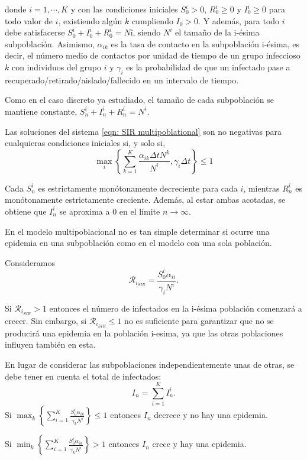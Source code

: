donde $i=1, \cdots , K$ y con las condiciones iniciales $S_0^i > 0$, $R_0^i \geq 0$ y $I_0^i\geq 0$ para todo valor de $i$, existiendo algún $k$ cumpliendo $I_0>0$. Y además, para todo $i$ debe satisfacerse $S_0^i+I_0^i+R_0^i=Nî$, siendo $N^i$ el tamaño de la i-ésima subpoblación. Asimismo, $\alpha_{ik}$ es la tasa de contacto en la subpoblación i-ésima, es decir, el número medio de contactos por unidad de tiempo de un grupo infeccioso $k$ con individuos del grupo $i$ y $\gamma_i$ es la probabilidad de que un infectado pase a recuperado/retirado/aislado/fallecido en un intervalo de tiempo.

Como en el caso discreto ya estudiado, el tamaño de cada subpoblación se mantiene constante, $S_n^i+I_n^i+R_n^i=N^i$.

\begin{proposition}
Las soluciones del sistema \eqref{eqn: SIR multipoblational} son no negativas para cualquieras condiciones iniciales si, y solo si,
$$\max_i \left\{ \sum_{k=1}^{K} \frac{\alpha_{ik}\Delta t N^k}{N^i}, \gamma_i\Delta t \right\} \leq 1$$
\end{proposition}

\begin{proposition}
Cada $S_n^i$ es estrictamente monótonamente decreciente para cada $i$, mientras $R_n^i$ es monótonamente estrictamente creciente. Además, al estar ambas acotadas, se obtiene que $I_n^i$ se aproxima a $0$ en el límite $n\rightarrow \infty$. 
\end{proposition}

En el modelo multipoblacional no es tan simple determinar si ocurre una epidemia en una subpoblación como en el modelo con una sola población.

Consideramos
$$\mathcal{R}_{i_{SIR}} = \frac{S_0^i\alpha_{ii}}{\gamma_i N^i}.$$

Si $\mathcal{R}_{i_{SIR}}>1$ entonces el número de infectados en la i-ésima población comenzará a crecer. Sin embargo, si $\mathcal{R}_{i_{SIR}} \leq 1$ no es suficiente para garantizar que no se producirá una epidemia en la población i-esima, ya que las otras poblaciones influyen también en esta.

En lugar de considerar las subpoblaciones independientemente unas de otras, se debe tener en cuenta el total de infectados:
$$I_n = \sum_{i=1}^{K}I_n^i.$$
Si $\max_{k} \left\{ \sum_{i=1}^{K}\frac{S_0^i\alpha_{ik}}{\gamma_kN^i} \right\}\leq 1$ entonces $I_n$ decrece y no hay una epidemia.

Si $\min_{k} \left\{ \sum_{i=1}^{K}\frac{S_0^i\alpha_{ik}}{\gamma_kN^i} \right\}> 1$ entonces $I_n$ crece y hay una epidemia.

